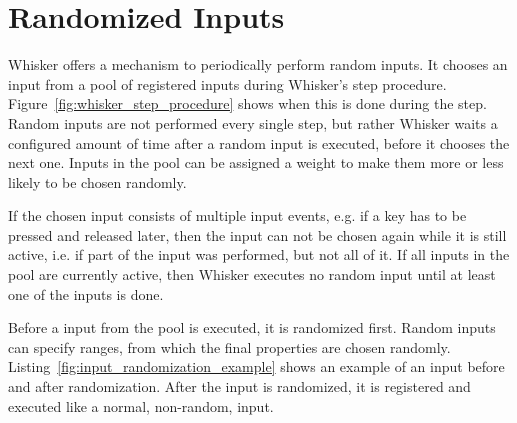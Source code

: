 \section{Randomized Inputs}

Whisker offers a mechanism to periodically perform random inputs.
It chooses an input from a pool of registered inputs during Whisker's step procedure.
Figure~\ref{fig:whisker_step_procedure} shows when this is done during the step.
Random inputs are not performed every single step,
but rather Whisker waits a configured amount of time after a random input is executed,
before it chooses the next one.
Inputs in the pool can be assigned a weight to make them more or less likely to be chosen randomly.
\parspace

If the chosen input consists of multiple input events,
e.g. if a key has to be pressed and released later,
then the input can not be chosen again while it is still active,
i.e. if part of the input was performed, but not all of it.
If all inputs in the pool are currently active,
then Whisker executes no random input until at least one of the inputs is done.
\parspace

Before a input from the pool is executed, it is randomized first.
Random inputs can specify ranges, from which the final properties are chosen randomly.
Listing~\ref{fig:input_randomization_example} shows an example of an input before and after randomization.
After the input is randomized, it is registered and executed like a normal, non-random, input.
\parspace

